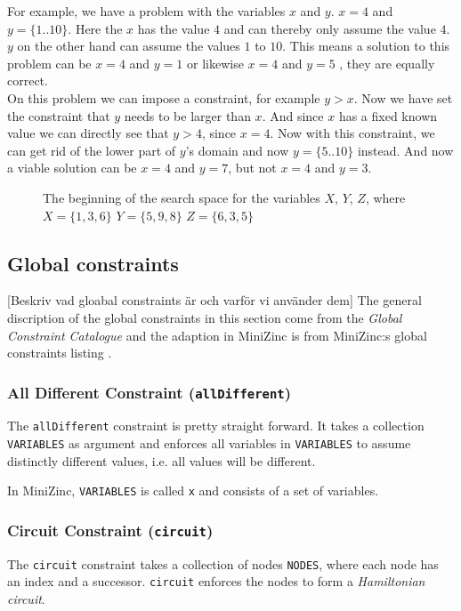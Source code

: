 \begin{framed}
For example, we have a problem with the variables $x$ and $y$. $x = 4$ and $y = \{1..10\}$. Here the $x$ has the value $4$ and can thereby only assume the value $4$. $y$ on the other hand can assume the values $1$ to $10$. This means a solution to this problem can be $x = 4$ and $y = 1$ or likewise $x = 4$ and $y = 5$ , they are equally correct.\\
On this problem we can impose a constraint, for example $y > x$. Now we have set the constraint that $y$ needs to be larger than $x$. And since $x$ has a fixed known value we can directly see that $y > 4$, since $x = 4$. Now with this constraint, we can get rid of the lower part of $y$'s domain and now $y = \{5..10\}$ instead. And now a viable solution can be $x = 4$ and $y = 7$, but not $x = 4$ and $y = 3$.
\end{framed}

\begin{figure}
  \caption{The beginning of the search space for the variables $X$, $Y$, $Z$, where $X=\{1,3,6\}$ $Y=\{5,9,8\}$ $Z=\{6,3,5\}$}
  \label{fig:search_space}
\end{figure}

\subsection{Global constraints}
[Beskriv vad gloabal constraints är och varför vi använder dem]
The general discription of the global constraints in this section come from the \emph{Global Constraint Catalogue} \cite{global_constraint_catalogue} and the adaption in MiniZinc is from MiniZinc:s global constraints listing \cite{mz_global_constraints}.

\subsubsection{All Different Constraint (\texttt{allDifferent})}
The \texttt{allDifferent} constraint is pretty straight forward. It takes a collection \texttt{VARIABLES} as argument and enforces all variables in \texttt{VARIABLES} to assume distinctly different values, i.e. all values will be different.

In MiniZinc, \texttt{VARIABLES} is called \texttt{x} and consists of a set of variables.

\subsubsection{Circuit Constraint (\texttt{circuit})}
The \texttt{circuit} constraint takes a collection of nodes \texttt{NODES}, where each node has an index and a successor. \texttt{circuit} enforces the nodes to form a \emph{Hamiltonian circuit}.

